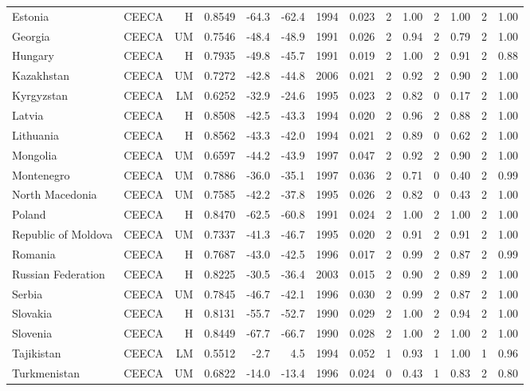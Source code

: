 \begin{longtable}{llrrrrrrrrrrrr}
Estonia & CEECA & H & 0.8549 & -64.3 & -62.4 & 1994 & 0.023 & 2 & 1.00 & 2 & 1.00 & 2 & 1.00 \\
Georgia & CEECA & UM & 0.7546 & -48.4 & -48.9 & 1991 & 0.026 & 2 & 0.94 & 2 & 0.79 & 2 & 1.00 \\
Hungary & CEECA & H & 0.7935 & -49.8 & -45.7 & 1991 & 0.019 & 2 & 1.00 & 2 & 0.91 & 2 & 0.88 \\
Kazakhstan & CEECA & UM & 0.7272 & -42.8 & -44.8 & 2006 & 0.021 & 2 & 0.92 & 2 & 0.90 & 2 & 1.00 \\
Kyrgyzstan & CEECA & LM & 0.6252 & -32.9 & -24.6 & 1995 & 0.023 & 2 & 0.82 & 0 & 0.17 & 2 & 1.00 \\
Latvia & CEECA & H & 0.8508 & -42.5 & -43.3 & 1994 & 0.020 & 2 & 0.96 & 2 & 0.88 & 2 & 1.00 \\
Lithuania & CEECA & H & 0.8562 & -43.3 & -42.0 & 1994 & 0.021 & 2 & 0.89 & 0 & 0.62 & 2 & 1.00 \\
Mongolia & CEECA & UM & 0.6597 & -44.2 & -43.9 & 1997 & 0.047 & 2 & 0.92 & 2 & 0.90 & 2 & 1.00 \\
Montenegro & CEECA & UM & 0.7886 & -36.0 & -35.1 & 1997 & 0.036 & 2 & 0.71 & 0 & 0.40 & 2 & 0.99 \\
North Macedonia & CEECA & UM & 0.7585 & -42.2 & -37.8 & 1995 & 0.026 & 2 & 0.82 & 0 & 0.43 & 2 & 1.00 \\
Poland & CEECA & H & 0.8470 & -62.5 & -60.8 & 1991 & 0.024 & 2 & 1.00 & 2 & 1.00 & 2 & 1.00 \\
Republic of Moldova & CEECA & UM & 0.7337 & -41.3 & -46.7 & 1995 & 0.020 & 2 & 0.91 & 2 & 0.91 & 2 & 1.00 \\
Romania & CEECA & H & 0.7687 & -43.0 & -42.5 & 1996 & 0.017 & 2 & 0.99 & 2 & 0.87 & 2 & 0.99 \\
Russian Federation & CEECA & H & 0.8225 & -30.5 & -36.4 & 2003 & 0.015 & 2 & 0.90 & 2 & 0.89 & 2 & 1.00 \\
Serbia & CEECA & UM & 0.7845 & -46.7 & -42.1 & 1996 & 0.030 & 2 & 0.99 & 2 & 0.87 & 2 & 1.00 \\
Slovakia & CEECA & H & 0.8131 & -55.7 & -52.7 & 1990 & 0.029 & 2 & 1.00 & 2 & 0.94 & 2 & 1.00 \\
Slovenia & CEECA & H & 0.8449 & -67.7 & -66.7 & 1990 & 0.028 & 2 & 1.00 & 2 & 1.00 & 2 & 1.00 \\
Tajikistan & CEECA & LM & 0.5512 &  -2.7 &   4.5 & 1994 & 0.052 & 1 & 0.93 & 1 & 1.00 & 1 & 0.96 \\
Turkmenistan & CEECA & UM & 0.6822 & -14.0 & -13.4 & 1996 & 0.024 & 0 & 0.43 & 1 & 0.83 & 2 & 0.80 \\

\end{longtable}
